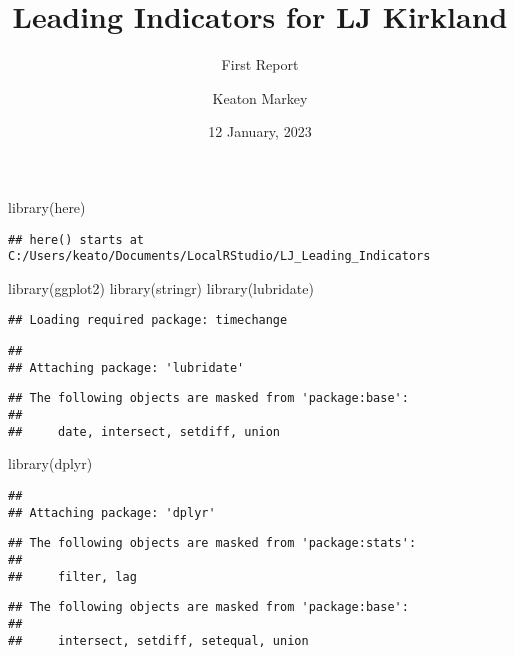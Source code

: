 \documentclass[
]{article}
\title{Leading Indicators for LJ Kirkland}
\subtitle{First Report}
\author{Keaton Markey}
\date{12 January, 2023}
\newenvironment{Shaded}{\begin{snugshade}}{\end{snugshade}}
\newcommand{\FunctionTok}[1]{\textcolor[rgb]{0.00,0.00,0.00}{#1}}
\newcommand{\NormalTok}[1]{#1}
\begin{document}
\maketitle

{
\hypersetup{linkcolor=}
\setcounter{tocdepth}{6}
\tableofcontents
}
\begin{Shaded}
\begin{Highlighting}[]
\FunctionTok{library}\NormalTok{(here)}
\end{Highlighting}
\end{Shaded}

\begin{verbatim}
## here() starts at C:/Users/keato/Documents/LocalRStudio/LJ_Leading_Indicators
\end{verbatim}

\begin{Shaded}
\begin{Highlighting}[]
\FunctionTok{library}\NormalTok{(ggplot2)}
\FunctionTok{library}\NormalTok{(stringr)}
\FunctionTok{library}\NormalTok{(lubridate)}
\end{Highlighting}
\end{Shaded}

\begin{verbatim}
## Loading required package: timechange
\end{verbatim}

\begin{verbatim}
## 
## Attaching package: 'lubridate'
\end{verbatim}

\begin{verbatim}
## The following objects are masked from 'package:base':
## 
##     date, intersect, setdiff, union
\end{verbatim}

\begin{Shaded}
\begin{Highlighting}[]
\FunctionTok{library}\NormalTok{(dplyr)}
\end{Highlighting}
\end{Shaded}

\begin{verbatim}
## 
## Attaching package: 'dplyr'
\end{verbatim}

\begin{verbatim}
## The following objects are masked from 'package:stats':
## 
##     filter, lag
\end{verbatim}

\begin{verbatim}
## The following objects are masked from 'package:base':
## 
##     intersect, setdiff, setequal, union
\end{verbatim}
\end{document}
